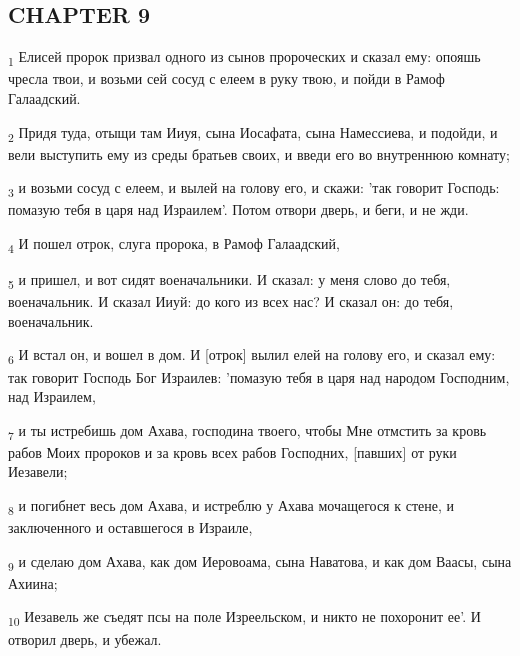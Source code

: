 \subsection{CHAPTER 9}
\begin{tcolorbox}
\textsubscript{1} Елисей пророк призвал одного из сынов пророческих и сказал ему: опояшь чресла твои, и возьми сей сосуд с елеем в руку твою, и пойди в Рамоф Галаадский.
\end{tcolorbox}
\begin{tcolorbox}
\textsubscript{2} Придя туда, отыщи там Ииуя, сына Иосафата, сына Намессиева, и подойди, и вели выступить ему из среды братьев своих, и введи его во внутреннюю комнату;
\end{tcolorbox}
\begin{tcolorbox}
\textsubscript{3} и возьми сосуд с елеем, и вылей на голову его, и скажи: 'так говорит Господь: помазую тебя в царя над Израилем'. Потом отвори дверь, и беги, и не жди.
\end{tcolorbox}
\begin{tcolorbox}
\textsubscript{4} И пошел отрок, слуга пророка, в Рамоф Галаадский,
\end{tcolorbox}
\begin{tcolorbox}
\textsubscript{5} и пришел, и вот сидят военачальники. И сказал: у меня слово до тебя, военачальник. И сказал Ииуй: до кого из всех нас? И сказал он: до тебя, военачальник.
\end{tcolorbox}
\begin{tcolorbox}
\textsubscript{6} И встал он, и вошел в дом. И [отрок] вылил елей на голову его, и сказал ему: так говорит Господь Бог Израилев: 'помазую тебя в царя над народом Господним, над Израилем,
\end{tcolorbox}
\begin{tcolorbox}
\textsubscript{7} и ты истребишь дом Ахава, господина твоего, чтобы Мне отмстить за кровь рабов Моих пророков и за кровь всех рабов Господних, [павших] от руки Иезавели;
\end{tcolorbox}
\begin{tcolorbox}
\textsubscript{8} и погибнет весь дом Ахава, и истреблю у Ахава мочащегося к стене, и заключенного и оставшегося в Израиле,
\end{tcolorbox}
\begin{tcolorbox}
\textsubscript{9} и сделаю дом Ахава, как дом Иеровоама, сына Наватова, и как дом Ваасы, сына Ахиина;
\end{tcolorbox}
\begin{tcolorbox}
\textsubscript{10} Иезавель же съедят псы на поле Изреельском, и никто не похоронит ее'. И отворил дверь, и убежал.
\end{tcolorbox}
